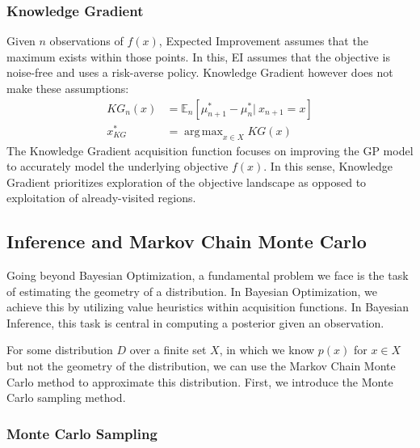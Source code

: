 \documentclass[paper=a4, fontsize=12pt]{scrartcl} %
\numberwithin{equation}{section} %
\numberwithin{figure}{section} %
\numberwithin{table}{section} %
\DeclareMathOperator*{\argmax}{arg\,max}
\begin{document}
\subsubsection{Knowledge Gradient}
Given $n$ observations of $f(x)$, Expected Improvement assumes that the maximum exists within those points. In this, EI assumes that the objective is noise-free and uses a risk-averse policy. Knowledge Gradient however does not make these 
assumptions:
\begin{align*}
    KG_n(x) &= \mathbb{E}_n \left[ \mu_{n+1}^* - \mu_n^* |\ x_{n+1} = x \right] \\
    x_{KG}^* &= \argmax_{x \in X} KG(x)
\end{align*}
The Knowledge Gradient acquisition function focuses on improving the GP model to accurately model the underlying objective $f(x)$. In this sense, Knowledge Gradient prioritizes exploration of the 
objective landscape as opposed to exploitation of already-visited regions.

\pagebreak

\subsection{Inference and Markov Chain Monte Carlo}

Going beyond Bayesian Optimization, a fundamental problem we face is the task of estimating the geometry of a distribution. In Bayesian Optimization, we achieve this by utilizing value heuristics within acquisition functions. In Bayesian Inference, this 
task is central in computing a posterior given an observation.

For some distribution $D$ over a finite set $X$, in which we know $p(x)$ for $x \in X$ but not the geometry of the distribution, we can use the Markov Chain Monte Carlo method to approximate this distribution. First, we introduce the Monte Carlo sampling method.

\subsubsection{Monte Carlo Sampling}
\end{document}
